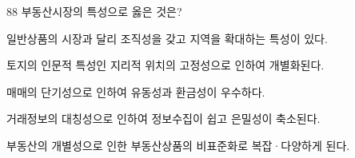 \begin{question}{88}
부동산시장의 특성으로 옳은 것은?
\begin{choices}
  \item 일반상품의 시장과 달리 조직성을 갖고 지역을 확대하는 특성이 있다.
  \item 토지의 인문적 특성인 지리적 위치의 고정성으로 인하여 개별화된다.
  \item 매매의 단기성으로 인하여 유동성과 환금성이 우수하다.
  \item 거래정보의 대칭성으로 인하여 정보수집이 쉽고 은밀성이 축소된다.
  \item 부동산의 개별성으로 인한 부동산상품의 비표준화로 복잡·다양하게 된다.
\end{choices}
\end{question}
